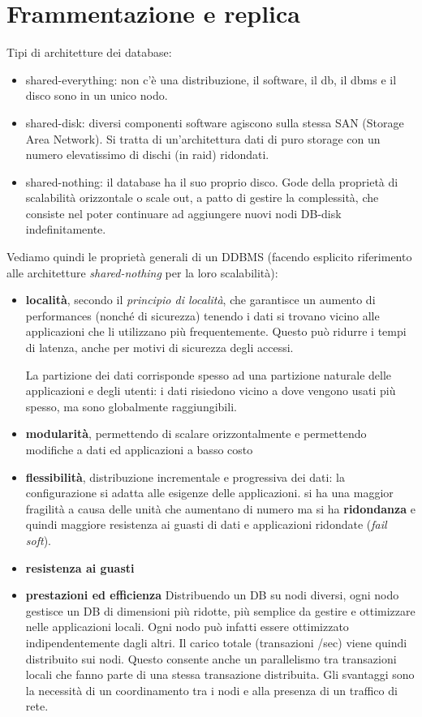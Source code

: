 \section{Frammentazione e replica}
Tipi di architetture dei database:
\begin{itemize}
    \item shared-everything: non c’è una distribuzione, il software, il db, il dbms e il disco sono in un unico nodo.
    \item shared-disk: diversi componenti software agiscono sulla stessa SAN (Storage Area Network). Si tratta di un’architettura dati di puro storage con un numero elevatissimo di dischi (in raid) ridondati. 
    \item shared-nothing: il database ha il suo proprio disco. Gode della proprietà di scalabilità orizzontale o scale out, a patto di gestire la complessità,
che consiste nel poter continuare ad aggiungere nuovi nodi DB-disk indefinitamente.
\end{itemize}

Vediamo quindi le proprietà generali di un DDBMS (facendo esplicito riferimento alle architetture \textit{shared-nothing} per la loro scalabilità):
\begin{itemize}
  \item \textbf{località}, secondo il \textit{principio di località}, che garantisce un aumento di performances (nonché di sicurezza) tenendo i dati si trovano vicino alle applicazioni che li utilizzano più frequentemente. Questo può ridurre i tempi di latenza, anche per motivi di sicurezza degli accessi.
  
  La partizione dei dati corrisponde spesso ad una partizione naturale delle applicazioni e degli utenti: i dati risiedono vicino a dove vengono usati più spesso, ma sono globalmente raggiungibili.
  \item \textbf{modularità}, permettendo di scalare orizzontalmente e permettendo modifiche a dati ed applicazioni a basso costo
  \item \textbf{flessibilità}, distribuzione incrementale e progressiva dei dati: la configurazione si adatta alle esigenze delle applicazioni.
   si ha una maggior fragilità a causa delle unità che aumentano di numero ma si ha \textbf{ridondanza} e quindi maggiore resistenza ai guasti di dati e applicazioni ridondate (\textit{fail soft}).
  \item \textbf{resistenza ai guasti}
  \item \textbf{prestazioni ed efficienza}
    Distribuendo un DB su nodi diversi, ogni nodo gestisce un DB di dimensioni più ridotte, più semplice da gestire e ottimizzare nelle applicazioni locali.
    Ogni nodo può infatti essere ottimizzato indipendentemente dagli altri. Il carico totale (transazioni /sec) viene quindi distribuito sui nodi. Questo consente anche un parallelismo tra transazioni locali che fanno parte di una stessa transazione distribuita.
    Gli svantaggi sono la necessità di un coordinamento tra i nodi e alla presenza di un traffico di rete.

\end{itemize}

